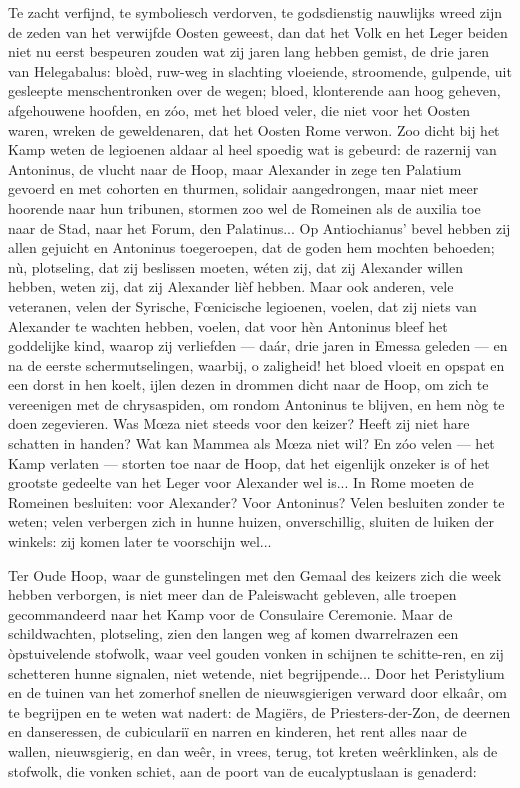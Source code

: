 \documentclass[a4paper, 12pt, oneside, dutch]{article}
\begin{document}
Te zacht verfijnd, te symboliesch verdorven, te godsdienstig nauwlijks wreed zijn de zeden van het verwijfde Oosten geweest, dan dat het Volk en het Leger beiden niet nu eerst bespeuren zouden wat zij jaren lang hebben gemist, de drie jaren van Helegabalus: bloèd, ruw-weg in slachting vloeiende, stroomende, gulpende, uit gesleepte menschentronken over de wegen; bloed, klonterende aan hoog geheven, afgehouwene hoofden, en zóo, met het bloed veler, die niet voor het Oosten waren, wreken de geweldenaren, dat het Oosten Rome verwon. Zoo dicht bij het Kamp weten de legioenen aldaar al heel spoedig wat is gebeurd: de razernij van Antoninus, de vlucht naar de Hoop, maar Alexander in zege ten Palatium gevoerd en met cohorten en thurmen, solidair aangedrongen, maar niet meer hoorende naar hun tribunen, stormen zoo wel de Romeinen als de auxilia toe naar de Stad, naar het Forum, den Palatinus... Op Antiochianus' bevel hebben zij allen gejuicht en Antoninus toegeroepen, dat de goden hem mochten behoeden; nù, plotseling, dat zij beslissen moeten, wéten zij, dat zij Alexander willen hebben, weten zij, dat zij Alexander lièf hebben. Maar ook anderen, vele veteranen, velen der Syrische, Fœnicische legioenen, voelen, dat zij niets van Alexander te wachten hebben, voelen, dat voor hèn Antoninus bleef het goddelijke kind, waarop zij verliefden --- daár, drie jaren in Emessa geleden --- en na de eerste schermutselingen, waarbij, o zaligheid! het bloed vloeit en opspat en een dorst in hen koelt, ijlen dezen in drommen dicht naar de Hoop, om zich te vereenigen met de chrysaspiden, om rondom Antoninus te blijven, en hem nòg te doen zegevieren. Was Mœza niet steeds voor den keizer? Heeft zij niet hare schatten in handen? Wat kan Mammea als Mœza niet wil? En zóo velen --- het Kamp verlaten --- storten toe naar de Hoop, dat het eigenlijk onzeker is of het grootste gedeelte van het Leger voor Alexander wel is... In Rome moeten de Romeinen besluiten: voor Alexander? Voor Antoninus? Velen besluiten zonder te weten; velen verbergen zich in hunne huizen, onverschillig, sluiten de luiken der winkels: zij komen later te voorschijn wel...

Ter Oude Hoop, waar de gunstelingen met den Gemaal des keizers zich die week hebben verborgen, is niet meer dan de Paleiswacht gebleven, alle troepen gecommandeerd naar het Kamp voor de Consulaire Ceremonie. Maar de schildwachten, plotseling, zien den langen weg af komen dwarrelrazen een òpstuivelende stofwolk, waar veel gouden vonken in schijnen te schitte-ren, en zij schetteren hunne signalen, niet wetende, niet begrijpende... Door het Peristylium en de tuinen van het zomerhof snellen de nieuwsgierigen verward door elkaâr, om te begrijpen en te weten wat nadert: de Magiërs, de Priesters-der-Zon, de deernen en danseressen, de cubiculariï en narren en kinderen, het rent alles naar de wallen, nieuwsgierig, en dan weêr, in vrees, terug, tot kreten weêrklinken, als de stofwolk, die vonken schiet, aan de poort van de eucalyptuslaan is genaderd:
\end{document}
